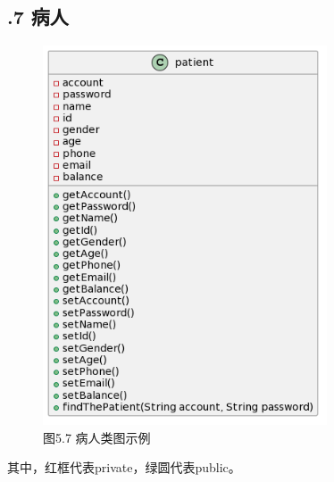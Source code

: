 \documentclass[24pt,a4paper]{article}%
\begin{document}
\subsection*{.7 病人}
\begin{figure}[H]
    \centering
    \includegraphics[width=0.75\textwidth]{images/patient.png}
    \caption*{图5.7 病人类图示例}
\end{figure}
其中，红框代表private，绿圆代表public。
\end{document}
